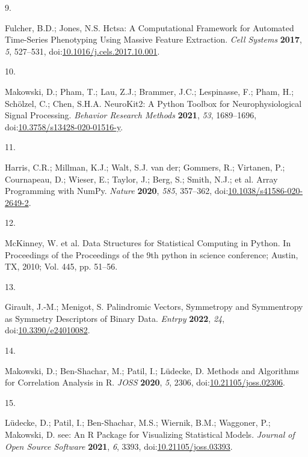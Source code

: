 \documentclass[
  man]{apa6}
\newlength{\cslhangindent}
\newlength{\csllabelwidth}
\newlength{\cslentryspacingunit} %
\newenvironment{CSLReferences}[2] %
 {%
  \setlength{\parindent}{0pt}
  \ifodd #1
  \let\oldpar\par
  \def\par{\hangindent=\cslhangindent\oldpar}
  \fi
  \setlength{\parskip}{#2\cslentryspacingunit}
 }%
 {}
\newcommand{\CSLLeftMargin}[1]{\parbox[t]{\csllabelwidth}{#1}}
\newcommand{\CSLRightInline}[1]{\parbox[t]{\linewidth - \csllabelwidth}{#1}\break}
\begin{document}
\begin{CSLReferences}{0}{0}
\leavevmode{}%
\CSLLeftMargin{9. }%
\CSLRightInline{Fulcher, B.D.; Jones, N.S. Hctsa: A Computational Framework for Automated Time-Series Phenotyping Using Massive Feature Extraction. \emph{Cell Systems} \textbf{2017}, \emph{5}, 527--531, doi:\href{https://doi.org/10.1016/j.cels.2017.10.001}{10.1016/j.cels.2017.10.001}.}

\leavevmode{}%
\CSLLeftMargin{10. }%
\CSLRightInline{Makowski, D.; Pham, T.; Lau, Z.J.; Brammer, J.C.; Lespinasse, F.; Pham, H.; Schölzel, C.; Chen, S.H.A. {NeuroKit}2: A Python Toolbox for Neurophysiological Signal Processing. \emph{Behavior Research Methods} \textbf{2021}, \emph{53}, 1689--1696, doi:\href{https://doi.org/10.3758/s13428-020-01516-y}{10.3758/s13428-020-01516-y}.}

\leavevmode{}%
\CSLLeftMargin{11. }%
\CSLRightInline{Harris, C.R.; Millman, K.J.; Walt, S.J. van der; Gommers, R.; Virtanen, P.; Cournapeau, D.; Wieser, E.; Taylor, J.; Berg, S.; Smith, N.J.; et al. Array Programming with {NumPy}. \emph{Nature} \textbf{2020}, \emph{585}, 357--362, doi:\href{https://doi.org/10.1038/s41586-020-2649-2}{10.1038/s41586-020-2649-2}.}

\leavevmode{}%
\CSLLeftMargin{12. }%
\CSLRightInline{McKinney, W. et al. Data Structures for Statistical Computing in Python. In Proceedings of the Proceedings of the 9th python in science conference; Austin, TX, 2010; Vol. 445, pp. 51--56.}

\leavevmode{}%
\CSLLeftMargin{13. }%
\CSLRightInline{Girault, J.-M.; Menigot, S. Palindromic Vectors, Symmetropy and Symmentropy as Symmetry Descriptors of Binary Data. \emph{Entrpy} \textbf{2022}, \emph{24}, doi:\href{https://doi.org/10.3390/e24010082}{10.3390/e24010082}.}

\leavevmode{}%
\CSLLeftMargin{14. }%
\CSLRightInline{Makowski, D.; Ben-Shachar, M.; Patil, I.; Lüdecke, D. Methods and Algorithms for Correlation Analysis in {R}. \emph{JOSS} \textbf{2020}, \emph{5}, 2306, doi:\href{https://doi.org/10.21105/joss.02306}{10.21105/joss.02306}.}

\leavevmode{}%
\CSLLeftMargin{15. }%
\CSLRightInline{Lüdecke, D.; Patil, I.; Ben-Shachar, M.S.; Wiernik, B.M.; Waggoner, P.; Makowski, D. {see}: An {R} Package for Visualizing Statistical Models. \emph{Journal of Open Source Software} \textbf{2021}, \emph{6}, 3393, doi:\href{https://doi.org/10.21105/joss.03393}{10.21105/joss.03393}.}


\end{CSLReferences}
\end{document}
